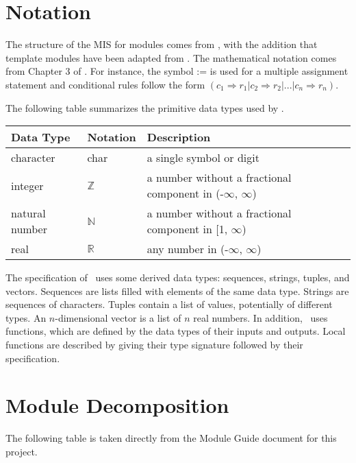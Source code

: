 \documentclass[12pt, titlepage]{article}
\begin{document}
\section{Notation}
The structure of the MIS for modules comes from \citet{HoffmanAndStrooper1995},
with the addition that template modules have been adapted from
\cite{GhezziEtAl2003}.  The mathematical notation comes from Chapter 3 of
\citet{HoffmanAndStrooper1995}.  For instance, the symbol := is used for a
multiple assignment statement and conditional rules follow the form $(c_1
\Rightarrow r_1 | c_2 \Rightarrow r_2 | ... | c_n \Rightarrow r_n )$.

The following table summarizes the primitive data types used by \progname. 

\begin{center}
\renewcommand{\arraystretch}{1.2}
\noindent 
\begin{tabular}{l l p{7.5cm}} 
\toprule 
\textbf{Data Type} & \textbf{Notation} & \textbf{Description}\\ 
\midrule
character & char & a single symbol or digit\\
integer & $\mathbb{Z}$ & a number without a fractional component in (-$\infty$, $\infty$) \\
natural number & $\mathbb{N}$ & a number without a fractional component in [1, $\infty$) \\
real & $\mathbb{R}$ & any number in (-$\infty$, $\infty$)\\
\bottomrule
\end{tabular} 
\end{center}

\noindent
The specification of \progname \ uses some derived data types: sequences, strings,
tuples, and vectors. Sequences are lists filled with elements of the same data type. Strings
are sequences of characters. Tuples contain a list of values, potentially of
different types. An $n$-dimensional vector is a list of $n$ real numbers. In addition, \progname \ uses functions, which
are defined by the data types of their inputs and outputs. Local functions are
described by giving their type signature followed by their specification.

\section{Module Decomposition}

The following table is taken directly from the Module Guide document for this project.
\end{document}

